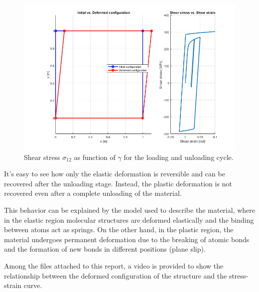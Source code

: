 \begin{figure}[H]
    \centering
    \includegraphics[width=\textwidth]{./img/loading_unloading_cycle.png}
    \caption{Shear stress $\sigma_{12}$ as function of $\gamma$ for the loading and unloading cycle.}
    \label{fig:loading_unloading_cycle}
\end{figure}

It's easy to see how only the elastic deformation is reversible and can be recovered after the unloading stage.
Instead, the plastic deformation is not recovered even after a complete unloading of the material.

This behavior can be explained by the model used to describe the material, where in the elastic region molecular structures are deformed elastically and the binding between atoms act as springs.
On the other hand, in the plastic region, the material undergoes permanent deformation due to the breaking of atomic bonds and the formation of new bonds in different positions (plane slip).

Among the files attached to this report, a video is provided to show the relationship between the deformed configuration of the structure and the stress-strain curve.

